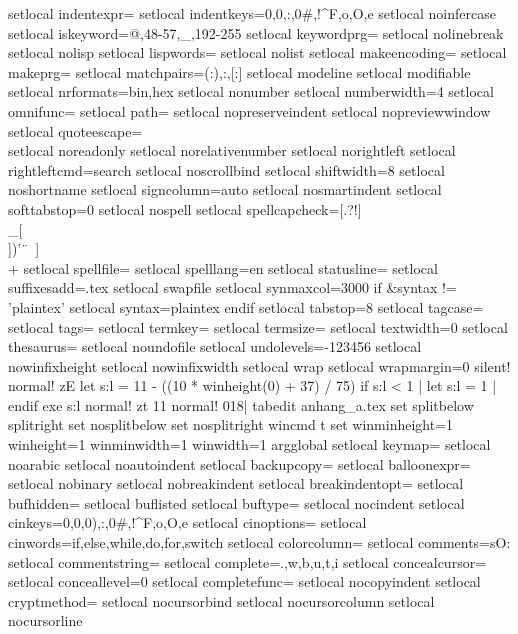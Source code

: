 {{setlocal indentexpr=
setlocal indentkeys=0{,0},:,0#,!^F,o,O,e
setlocal noinfercase
setlocal iskeyword=@,48-57,_,192-255
setlocal keywordprg=
setlocal nolinebreak
setlocal nolisp
setlocal lispwords=
setlocal nolist
setlocal makeencoding=
setlocal makeprg=
setlocal matchpairs=(:),{:},[:]
setlocal modeline
setlocal modifiable
setlocal nrformats=bin,hex
setlocal nonumber
setlocal numberwidth=4
setlocal omnifunc=
setlocal path=
setlocal nopreserveindent
setlocal nopreviewwindow
setlocal quoteescape=\\
setlocal noreadonly
setlocal norelativenumber
setlocal norightleft
setlocal rightleftcmd=search
setlocal noscrollbind
setlocal shiftwidth=8
setlocal noshortname
setlocal signcolumn=auto
setlocal nosmartindent
setlocal softtabstop=0
setlocal nospell
setlocal spellcapcheck=[.?!]\\_[\\])'\"\	\ ]\\+
setlocal spellfile=
setlocal spelllang=en
setlocal statusline=
setlocal suffixesadd=.tex
setlocal swapfile
setlocal synmaxcol=3000
if &syntax != 'plaintex'
setlocal syntax=plaintex
endif
setlocal tabstop=8
setlocal tagcase=
setlocal tags=
setlocal termkey=
setlocal termsize=
setlocal textwidth=0
setlocal thesaurus=
setlocal noundofile
setlocal undolevels=-123456
setlocal nowinfixheight
setlocal nowinfixwidth
setlocal wrap
setlocal wrapmargin=0
silent! normal! zE
let s:l = 11 - ((10 * winheight(0) + 37) / 75)
if s:l < 1 | let s:l = 1 | endif
exe s:l
normal! zt
11
normal! 018|
tabedit anhang_a.tex
set splitbelow splitright
set nosplitbelow
set nosplitright
wincmd t
set winminheight=1 winheight=1 winminwidth=1 winwidth=1
argglobal
setlocal keymap=
setlocal noarabic
setlocal noautoindent
setlocal backupcopy=
setlocal balloonexpr=
setlocal nobinary
setlocal nobreakindent
setlocal breakindentopt=
setlocal bufhidden=
setlocal buflisted
setlocal buftype=
setlocal nocindent
setlocal cinkeys=0{,0},0),:,0#,!^F,o,O,e
setlocal cinoptions=
setlocal cinwords=if,else,while,do,for,switch
setlocal colorcolumn=
setlocal comments=sO:%
setlocal commentstring=%
setlocal complete=.,w,b,u,t,i
setlocal concealcursor=
setlocal conceallevel=0
setlocal completefunc=
setlocal nocopyindent
setlocal cryptmethod=
setlocal nocursorbind
setlocal nocursorcolumn
setlocal nocursorline
}}
